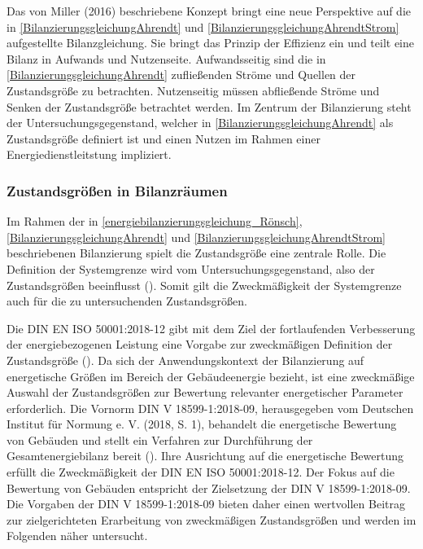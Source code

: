 Das von Miller (2016) beschriebene Konzept bringt eine neue Perspektive auf die in \eqref{BilanzierungsgleichungAhrendt} und \eqref{BilanzierungsgleichungAhrendtStrom} 
aufgestellte Bilanzgleichung. Sie bringt das Prinzip der Effizienz ein und teilt eine Bilanz in Aufwands und Nutzenseite. 
Aufwandsseitig sind die in \eqref{BilanzierungsgleichungAhrendt} zufließenden Ströme und Quellen der Zustandsgröße zu betrachten. 
Nutzenseitig müssen abfließende Ströme und Senken der Zustandsgröße betrachtet werden. Im Zentrum der Bilanzierung steht der Untersuchungsgegenstand, welcher in 
\eqref{BilanzierungsgleichungAhrendt} als Zustandsgröße definiert ist und einen Nutzen im Rahmen einer Energiedienstleitstung impliziert. 


\subsubsection{Zustandsgrößen in Bilanzräumen}
Im Rahmen der in \eqref{energiebilanzierungsgleichung_Rönsch}, \eqref{BilanzierungsgleichungAhrendt} und \eqref{BilanzierungsgleichungAhrendtStrom} beschriebenen Bilanzierung 
spielt die Zustandsgröße eine zentrale Rolle. 
Die Definition der Systemgrenze wird vom Untersuchungsgegenstand, also der Zustandsgrößen beeinflusst (\cite[S. 109]{Miller.2016}). Somit gilt die Zweckmäßigkeit der Systemgrenze 
auch für die zu untersuchenden Zustandsgrößen.

Die DIN EN ISO 50001:2018-12 gibt mit dem Ziel der fortlaufenden Verbesserung der energiebezogenen Leistung eine Vorgabe zur zweckmäßigen Definition der Zustandsgröße 
(\cite[S. 11]{DIN50001.2018}).
Da sich der Anwendungskontext der Bilanzierung auf energetische Größen im Bereich der Gebäudeenergie bezieht, ist eine zweckmäßige Auswahl der Zustandsgrößen zur Bewertung 
relevanter energetischer Parameter erforderlich.
Die Vornorm DIN V 18599-1:2018-09, herausgegeben vom Deutschen Institut für Normung e. V. (2018, S. 1), behandelt die energetische Bewertung von Gebäuden und stellt ein 
Verfahren zur Durchführung der Gesamtenergiebilanz bereit (\cite[S. 9]{DIN18599.2018}). Ihre Ausrichtung auf die energetische Bewertung erfüllt die Zweckmäßigkeit der 
DIN EN ISO 50001:2018-12. Der Fokus auf die Bewertung von Gebäuden entspricht der Zielsetzung der DIN V 18599-1:2018-09. 
Die Vorgaben der DIN V 18599-1:2018-09 bieten daher einen wertvollen Beitrag zur zielgerichteten Erarbeitung von zweckmäßigen Zustandsgrößen und werden im Folgenden 
näher untersucht.

